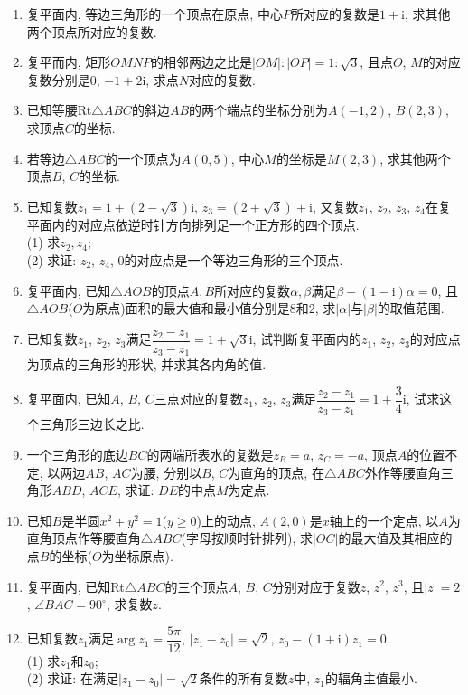 \documentclass[10pt,a4paper]{article}
\begin{document}
\begin{enumerate}[1.]
\item 复平面内, 等边三角形的一个顶点在原点, 中心$P$所对应的复数是$1+\mathrm{i}$, 求其他两个顶点所对应的复数.
\item 复平而内, 矩形$OMNP$的相邻两边之比是$|OM|:|OP|=1:\sqrt 3$, 且点$O$, $M$的对应复数分别是0, $-1+2\mathrm{i}$, 求点$N$对应的复数.
\item 已知等腰Rt$\triangle ABC$的斜边$AB$的两个端点的坐标分别为$A(-1,2)$, $B(2,3)$, 求顶点$C$的坐标.
\item 若等边$\triangle ABC$的一个顶点为$A(0,5)$, 中心$M$的坐标是$M(2,3)$, 求其他两个顶点$B$, $C$的坐标.
\item 已知复数$z_1=1+(2-\sqrt 3)\mathrm{i}$, $z_3=(2+\sqrt 3)+\mathrm{i}$, 又复数$z_1$, $z_2$, $z_3$, $z_4$在复平面内的对应点依逆时针方向排列足一个正方形的四个顶点.\\
(1) 求$z_2,z_4$;\\
(2) 求证: $z_2$, $z_4$, 0的对应点是一个等边三角形的三个顶点.
\item 复平面内, 已知$\triangle AOB$的顶点$A,B$所对应的复数$\alpha,\beta$满足$\beta +(1-\mathrm{i})\alpha =0$, 且$\triangle AOB$($O$为原点)面积的最大值和最小值分别是$8$和$2$, 求$|\alpha|$与$|\beta|$的取值范围.
\item 已知复数$z_1$, $z_2$, $z_3$满足$\dfrac{z_2-z_1}{z_3-z_1}=1+\sqrt 3\mathrm{i}$, 试判断复平面内的$z_1$, $z_2$, $z_3$的对应点为顶点的三角形的形状, 并求其各内角的值.
\item 复平面内, 已知$A$, $B$, $C$三点对应的复数$z_1$, $z_2$, $z_3$满足$\dfrac{z_2-z_1}{z_3-z_1}=1+\dfrac 34\mathrm{i}$, 试求这个三角形三边长之比.
\item 一个三角形的底边$BC$的两端所表水的复数是$z_B=a$, $z_C=-a$, 顶点$A$的位置不定, 以两边$AB$, $AC$为腰, 分别以$B$, $C$为直角的顶点, 在$\triangle ABC$外作等腰直角三角形$ABD$, $ACE$, 求证: $DE$的中点$M$为定点.
\item 已知$B$是半圆$x^2+y^2=1$($y\ge 0$)上的动点, $A(2,0)$是$x$轴上的一个定点, 以$A$为直角顶点作等腰直角$\triangle ABC$(字母按顺时针排列), 求$|OC|$的最大值及其相应的点$B$的坐标($O$为坐标原点).
\item 复平面内, 已知Rt$\triangle ABC$的三个顶点$A$, $B$, $C$分别对应于复数$z$, $z^2$, $z^3$, 且$|z|=2$, $\angle BAC=90^\circ$, 求复数$z$.
\item 已知复数$z_1$满足$\arg z_1=\dfrac{5\pi }{12}$, $|z_1-z_0|=\sqrt 2$, $z_0-(1+\mathrm{i})z_1=0$.\\
(1) 求$z_1$和$z_0$;\\
(2) 求证: 在满足$|z_1-z_0|=\sqrt 2$条件的所有复数$z$中, $z_1$的辐角主值最小.

\end{enumerate}
\end{document}
